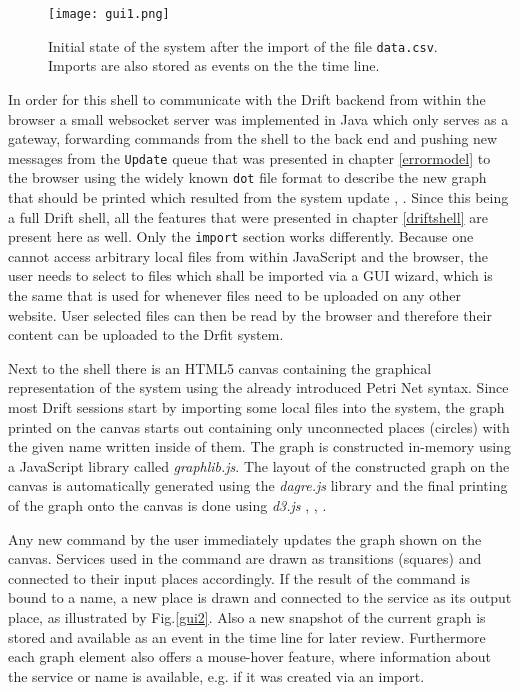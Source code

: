 \begin{figure}[h]
  \texttt{[image: gui1.png]}
  \caption{Initial state of the system after the import of
           the file \texttt{data.csv}. Imports are also stored
           as events on the the time line.}
  \label{gui1}
\end{figure}

In order for this shell to communicate with the Drift backend
from within the browser a small websocket server was implemented
in Java which only serves as a gateway, forwarding commands from
the shell to the back end and pushing new messages from the
\texttt{Update} queue that was presented in
chapter \ref{errormodel} to the browser using the widely known
\texttt{dot} file format to describe the new graph that should
be printed which resulted from the system update \cite{dotlang},
\cite{dotwiki}.
Since this being a full Drift shell, all the features that were
presented in chapter \ref{driftshell} are present here as well.
Only the \texttt{import} section works differently. Because
one cannot access arbitrary local files from within JavaScript
and the browser, the user needs to select to files which shall
be imported via a GUI wizard, which is the same that is used
for whenever files need to be uploaded on any other website.
User selected files can then be read by the browser and therefore
their content can be uploaded to the Drfit system.

Next to the shell there is an HTML5 canvas containing the graphical
representation of the system using the already introduced Petri Net syntax.
Since most Drift sessions start by importing some local files into the
system, the graph printed on the canvas starts out containing
only unconnected places (circles) with the given name written inside
of them.
The graph is constructed in-memory using a JavaScript library called
\textit{graphlib.js}. The layout of the constructed graph on the
canvas is automatically generated using the \textit{dagre.js}
library and the final printing of the graph onto the canvas is
done using \textit{d3.js} \cite{graphlibjs}, \cite{dagrejs},
\cite{d3js}.

Any new command by the user immediately updates the graph shown
on the canvas. Services used in the command are drawn as transitions
(squares) and connected to their input places accordingly.
If the result of the command is bound to a name, a new place is
drawn and connected to the service as its output place, as
illustrated by Fig.\ref{gui2}. Also a new snapshot of the
current graph is stored and available as an event in the time
line for later review. Furthermore each graph element also
offers a mouse-hover feature, where information about the
service or name is available, e.g. if it was created via an
import.

